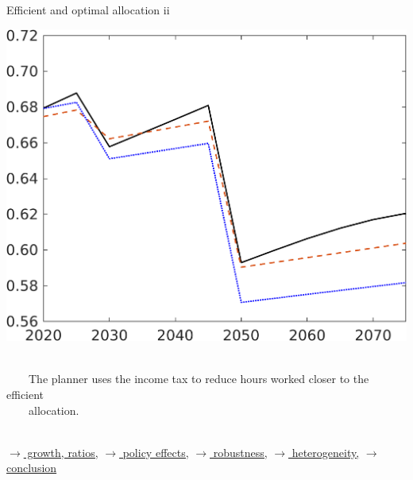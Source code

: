 \documentclass[11pt,aspectratio=169]{beamer}
\newcommand{\ar}{$\Rightarrow$ \ }
\begin{document}
\begin{frame}{Efficient and optimal allocation ii }
\begin{minipage}[]{0.3\textwidth}
\end{minipage}
	\begin{minipage}[]{0.3\textwidth}
	\includegraphics[width=1\textwidth]{../codding_model/own_basedOnFried/optimalPol_elastS_DisuSci/figures/all_1705/C_CompEffOPT_T_NoTaus_spillover0_noskill0_sep1_BN0_ineq0_red0_xgrowth0_zero0_countec0_etaa0.79_lgd0.png}
\end{minipage}

\vspace{6mm}
\begin{block}{}
	\ \\ 	\ \ \ \ 
	 The planner uses the income tax to reduce hours worked closer to the efficient \\ \ \ \ \  allocation.  \\ \ 
\end{block}

%	
	\vspace{-3mm}
\hfill
\hyperlink{effalloOthers}{\tiny{$\rightarrow$ growth, ratios,}}
\hyperlink{disen}{\tiny{$\rightarrow$ policy effects,}}
\hyperlink{robustness}{\tiny{$\rightarrow$ robustness,}}
\hyperlink{heterogeneity}{\tiny{$\rightarrow$ heterogeneity,}}
\hyperlink{conc}{\tiny{$\rightarrow$ conclusion}}
 
\hypertarget{effalloback}{}
\end{frame}
\end{document}
